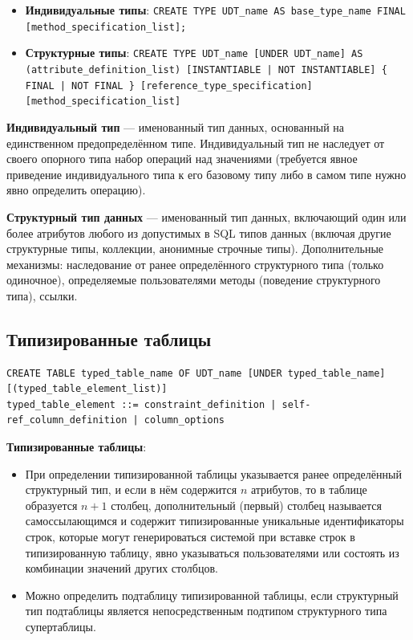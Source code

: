 \documentclass[a4paper,12pt]{article}
\begin{document}
\begin{itemize}
    \item \textbf{Индивидуальные типы}: \texttt{CREATE TYPE UDT\_name AS base\_type\_name FINAL [method\_specification\_list];}
    \item \textbf{Структурные типы}: \texttt{CREATE TYPE UDT\_name [UNDER UDT\_name] AS (attribute\_definition\_list) [INSTANTIABLE | NOT INSTANTIABLE] \{ FINAL | NOT FINAL \} [reference\_type\_specification] [method\_specification\_list]}
\end{itemize}

\textbf{Индивидуальный тип} --- именованный тип данных, основанный на единственном предопределённом типе. Индивидуальный тип не наследует от своего опорного типа набор операций над значениями (требуется явное приведение индивидуального типа к его базовому типу либо в самом типе нужно явно определить операцию).

\textbf{Структурный тип данных} --- именованный тип данных, включающий один или более атрибутов любого из допустимых в SQL типов данных (включая другие структурные типы, коллекции, анонимные строчные типы). Дополнительные механизмы: наследование от ранее определённого структурного типа (только одиночное), определяемые пользователями методы (поведение структурного типа), ссылки.

\subsection{Типизированные таблицы}

\begin{verbatim}
CREATE TABLE typed_table_name OF UDT_name [UNDER typed_table_name] [(typed_table_element_list)]
typed_table_element ::= constraint_definition | self-ref_column_definition | column_options
\end{verbatim}

\textbf{Типизированные таблицы}:
\begin{itemize}
    \item При определении типизированной таблицы указывается ранее определённый структурный тип, и если в нём содержится $n$ атрибутов, то в таблице образуется $n+1$ столбец, дополнительный (первый) столбец называется самоссылающимся и содержит типизированные уникальные идентификаторы строк, которые могут генерироваться системой при вставке строк в типизированную таблицу, явно указываться пользователями или состоять из комбинации значений других столбцов.
    \item Можно определить подтаблицу типизированной таблицы, если структурный тип подтаблицы является непосредственным подтипом структурного типа супертаблицы.
\end{itemize}
\end{document}
